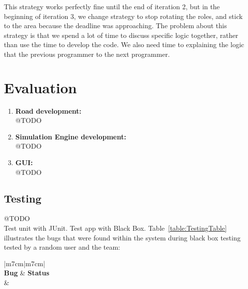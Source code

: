 \documentclass[11pt]{article}
\begin{document}
This strategy works perfectly fine until the end of iteration 2, but in the beginning of iteration 3, we change strategy to stop rotating the roles, and stick to the area because the deadline was approaching. The problem about this strategy is that we spend a lot of time to discuss specific logic together, rather than use the time to develop the code. We also need time to explaining the logic that the previous programmer to the next programmer. 

	
\section{Evaluation} %
\begin{enumerate}
	\item \textbf{Road development:} 
	\\@TODO
	\item \textbf{Simulation Engine development:} 
	\\@TODO
	\item \textbf{GUI:} 
	\\@TODO
\end{enumerate}

\subsection{Testing} 
@TODO
\\Test unit with JUnit. Test app with Black Box. 
Table~\ref{table:TestingTable} illustrates the bugs that were found within the system during black box testing tested by a random user and the team:
\begin{center}
	\begin{table}[!htb]
	\begin{tabular}{|m{7cm}|m{7cm}|}
		 \hline
		 \\ 
		\hline 
		 \centering \textbf{Bug} & \textbf{Status}\\\hline
		 &  \\  \hline
		
	\end{tabular}
	\caption{Testing Table}
		\label{table:TestingTable}
	\end{table}
\end{center}
\end{document}

